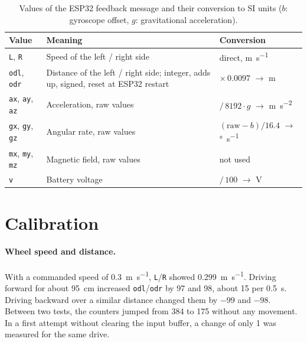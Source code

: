 \begin{table}[H]
  \centering
  \small
  \caption{Values of the ESP32 feedback message and their conversion to SI units ($b$: gyroscope offset, $g$: gravitational acceleration).}
  \label{tab:feedback}
  \begin{tabularx}{\textwidth}{@{}l X >{\raggedright\arraybackslash}p{3.8cm}@{}}
    \toprule
    \textbf{Value} & \textbf{Meaning} & \textbf{Conversion} \\
    \midrule
    \texttt{L}, \texttt{R}        & Speed of the left / right side & direct, \si{\metre\per\second} \\
    \texttt{odl}, \texttt{odr}    & Distance of the left / right side; integer, adds up, signed, reset at ESP32 restart & $\times\,0.0097$ $\rightarrow$ \si{\metre} \\
    \texttt{ax}, \texttt{ay}, \texttt{az} & Acceleration, raw values & $/\,8192 \cdot g$ $\rightarrow$ \si{\metre\per\second\squared} \\
    \texttt{gx}, \texttt{gy}, \texttt{gz} & Angular rate, raw values & $(\text{raw} - b)/16.4$ $\rightarrow$ \si{\degree\per\second} \\
    \texttt{mx}, \texttt{my}, \texttt{mz} & Magnetic field, raw values & not used \\
    \texttt{v}                    & Battery voltage & $/\,100$ $\rightarrow$ \si{\volt} \\
    \bottomrule
  \end{tabularx}
\end{table}

\section{Calibration}
\label{sec:calibration_results}

\paragraph{Wheel speed and distance.} With a commanded speed of \SI{0.3}{\metre\per\second}, \texttt{L}/\texttt{R} showed \SI{0.299}{\metre\per\second}. Driving forward for about \SI{95}{\centi\metre} increased \texttt{odl}/\texttt{odr} by 97 and 98, about 15 per \SI{0.5}{\second}. Driving backward over a similar distance changed them by $-99$ and $-98$. Between two tests, the counters jumped from 384 to 175 without any movement. In a first attempt without clearing the input buffer, a change of only 1 was measured for the same drive.

